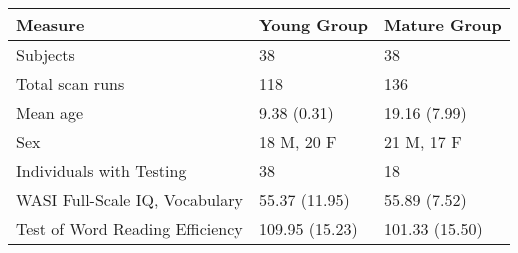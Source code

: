 \begin{tabular}{lll}
\toprule
Measure &               Young Group &               Mature Group \\
\midrule
Subjects                        &              38 &              38 \\
Total scan runs                 &             118 &             136 \\
Mean age                        &     9.38 (0.31) &    19.16 (7.99) \\
Sex                             &      18 M, 20 F &      21 M, 17 F \\
Individuals with Testing		& 			  38 &				18	\\
WASI Full-Scale IQ, Vocabulary  &   55.37 (11.95) &    55.89 (7.52) \\
Test of Word Reading Efficiency &  109.95 (15.23) &  101.33 (15.50) \\
\bottomrule
\end{tabular}